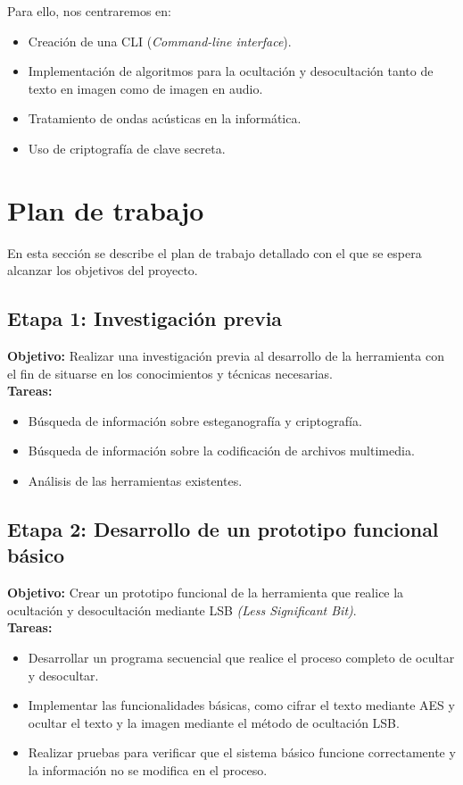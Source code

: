 Para ello, nos centraremos en:

\begin{itemize}
    \item Creación de una CLI (\textit{Command-line interface}).
    \item Implementación de algoritmos para la ocultación y desocultación tanto de texto en imagen como de imagen en audio.
    \item Tratamiento de ondas acústicas en la informática.
    \item Uso de criptografía de clave secreta.
\end{itemize}


\section{Plan de trabajo}
\label{sec:trab}
En esta sección se describe el plan de trabajo detallado con el que se espera alcanzar los objetivos del proyecto. 

\subsection{Etapa 1: Investigación previa }
\label{subsec:1}

\textbf{Objetivo:} Realizar una investigación previa al desarrollo de la herramienta con el fin de situarse en los conocimientos y técnicas necesarias.\\

\textbf{Tareas:}
\begin{itemize}
    \item Búsqueda de información sobre esteganografía y criptografía.
    \item Búsqueda de información sobre la codificación de archivos multimedia.
    \item Análisis de las herramientas existentes.
\end{itemize}



\subsection{Etapa 2: Desarrollo de un prototipo funcional básico}
\label{subsec:2}
\textbf{Objetivo:} Crear un prototipo funcional de la herramienta que realice la ocultación y desocultación mediante LSB \textit{(Less Significant Bit)}.\\

\textbf{Tareas:}
\begin{itemize}
    \item Desarrollar un programa secuencial que realice el proceso completo de ocultar y desocultar.
    \item Implementar las funcionalidades básicas, como cifrar el texto mediante AES y ocultar el texto y la imagen mediante el método de ocultación LSB.
    \item Realizar pruebas para verificar que el sistema básico funcione correctamente y la información no se modifica en el proceso.
\end{itemize}



